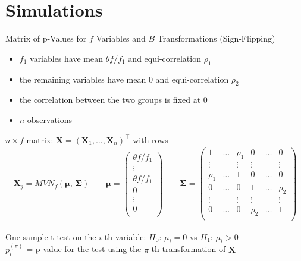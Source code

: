 \documentclass[aspectratio=169]{beamer}
\begin{document}
\section{Simulations}
\begin{frame}{Matrix of p-Values for $f$ Variables and $B$ Transformations (Sign-Flipping)}
\begin{itemize}
\item $f_1$ variables have mean $\theta f/f_1$ and equi-correlation $\rho_1$
\item the remaining variables have mean 0 and equi-correlation $\rho_2$
\item the correlation between the two groups is fixed at 0
\item $n$ observations
\end{itemize}

\vspace{3mm}
$n\times f$ matrix: $\mathbf{X}=(\mathbf{X}_1,\ldots,\mathbf{X}_n)^\top$ with rows
\begin{align*}
\mathbf{X}_j = MVN_{f}(\boldsymbol{\mu},\,\boldsymbol{\Sigma})\quad\quad
\boldsymbol{\mu}=
\begin{pmatrix}
\theta f/f_1\\
\vdots\\
\theta f/f_1\\
0\\
\vdots\\
0\\
\end{pmatrix}
\quad\quad
\boldsymbol{\Sigma} =
\begin{pmatrix}
1 & \ldots & \rho_1 & 0 & \ldots & 0\\
\vdots &  & \vdots & \vdots &  & \vdots\\
\rho_1 & \ldots & 1 & 0 & \ldots & 0\\
0 & \ldots & 0 & 1 & \ldots & \rho_2\\
\vdots &  & \vdots & \vdots &  & \vdots\\
0 & \ldots & 0 & \rho_2 & \ldots & 1\\
\end{pmatrix}
\end{align*}

\vspace{3mm}
One-sample t-test on the $i$-th variable: $H_0:\,\mu_i=0$ vs $H_1:\,\mu_i>0$\\
$p_i^{(\pi)}$ = p-value for the test using the $\pi$-th transformation of $\mathbf{X}$
\end{frame}
\end{document}
